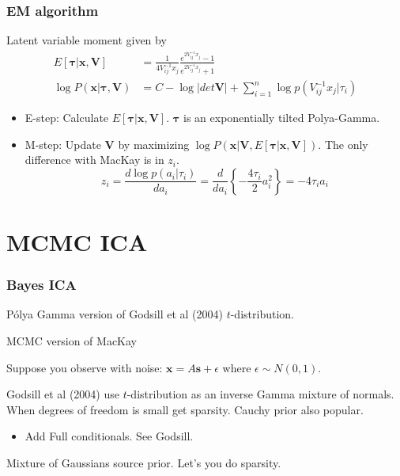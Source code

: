 \documentclass{beamer}
\begin{document}
\begin{frame}
\frametitle{EM algorithm}
\footnotesize

Latent variable moment given by 
\begin{align}
E[\bm{\tau} | \bm{x, V}] &= \frac{1}{4V_{ij}^{-1} x_j} \frac{e^{2V_{ij}^{-1} x_j}-1}{e^{2V_{ij}^{-1} x_j} + 1}\\
\log P(\bm{x} | \bm{\tau,V}) &= C - \log |det\bm{V}| +  \sum_{i=1}^n \log   p(V_{ij}^{-1} x_j | \tau_i)
\end{align}
\footnotesize
\begin{itemize}
\item E-step: Calculate $E[\bm{\tau} | \bm{x, V}]$. $\bm{\tau}$ is an exponentially tilted Polya-Gamma.
\item M-step: Update $\bm{V}$ by maximizing $\log P(\bm{x} | \bm{V}, E[\bm{\tau} | \bm{x, V}])$. The only difference with MacKay is in $z_i$. 
$$
z_i =\frac{d\log p(a_i|\tau_i)}{da_i} = \frac{d}{da_i} \left\{-\frac{4\tau_i}{2} a_i^2\right\} =-4\tau_ia_i
$$
\end{itemize}

\end{frame}


\section{MCMC ICA}
\begin{frame}
\frametitle{Bayes ICA}
\footnotesize

P\'olya Gamma  version of Godsill et al (2004) $t$-distribution.  

\vspace{0.1in}

MCMC version of MacKay


\vspace{0.1in}

Suppose you observe with noise: $ \bm x = A \bm s + \epsilon $ where $ \epsilon \sim N(0,1) $.

\vspace{0.1in}

Godsill et al (2004) use $t$-distribution as an inverse Gamma mixture of normals. 
When degrees of freedom is small get sparsity. Cauchy prior also popular. 

\begin{itemize}
\item Add Full conditionals.  See Godsill. 
\end{itemize}

Mixture of Gaussians source prior. Let's you do sparsity.  

\vspace{0.1in} 

\end{frame}
\end{document}
